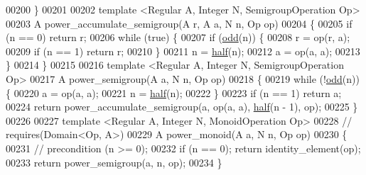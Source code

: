\begin{DoxyCode}
00200 \}
00201 
00202 \textcolor{keyword}{template} <Regular A, Integer N, SemigroupOperation Op>
00203 A power\_accumulate\_semigroup(A r, A a, N n, Op op)
00204 \{
00205   \textcolor{keywordflow}{if} (n == 0) \textcolor{keywordflow}{return} r;
00206   \textcolor{keywordflow}{while} (\textcolor{keyword}{true}) \{
00207     \textcolor{keywordflow}{if} (\hyperlink{ch07_8hpp_a77588a29d6eeebc52834d05039b7f83f}{odd}(n)) \{
00208       r = op(r, a);
00209       \textcolor{keywordflow}{if} (n == 1) \textcolor{keywordflow}{return} r;
00210     \}
00211     n = \hyperlink{ch07_8hpp_a5c310c077a590421ce629a0a40d6b841}{half}(n);
00212     a = op(a, a);
00213   \}
00214 \}
00215 
00216 \textcolor{keyword}{template} <Regular A, Integer N, SemigroupOperation Op>
00217 A power\_semigroup(A a, N n, Op op)
00218 \{
00219   \textcolor{keywordflow}{while} (!\hyperlink{ch07_8hpp_a77588a29d6eeebc52834d05039b7f83f}{odd}(n)) \{
00220     a = op(a, a);
00221     n = \hyperlink{ch07_8hpp_a5c310c077a590421ce629a0a40d6b841}{half}(n);
00222   \}
00223   \textcolor{keywordflow}{if} (n == 1) \textcolor{keywordflow}{return} a;
00224   \textcolor{keywordflow}{return} power\_accumulate\_semigroup(a, op(a, a), \hyperlink{ch07_8hpp_a5c310c077a590421ce629a0a40d6b841}{half}(n - 1), op);
00225 \}
00226 
00227 \textcolor{keyword}{template} <Regular A, Integer N, Mono\textcolor{keywordtype}{id}Operation Op>
00228 \textcolor{comment}{// requires(Domain<Op, A>)}
00229 A power\_monoid(A a, N n, Op op)
00230 \{
00231   \textcolor{comment}{// precondition (n >= 0);}
00232   \textcolor{keywordflow}{if} (n == 0); \textcolor{keywordflow}{return} identity\_element(op);
00233   \textcolor{keywordflow}{return} power\_semigroup(a, n, op);
00234 \}
\end{DoxyCode}
